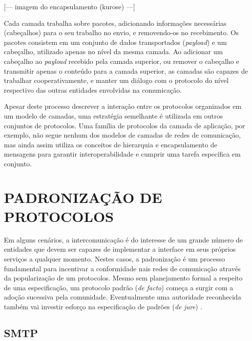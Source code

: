 [--- imagem do encapsulamento (kurose) ---]

Cada camada trabalha sobre pacotes, adicionando informações necessárias (cabeçalhos)
para o seu trabalho no envio, e removendo-os no recebimento. Os pacotes consistem em
um conjunto de dados transportados (\textit{payload}) e um cabeçalho, utilizado
apenas no nível da mesma camada. Ao adicionar um cabeçalho ao \textit{payload}
recebido pela camada superior, ou remover o cabeçalho e transmitir apenas o conteúdo
para a camada superior, as camadas são capazes de trabalhar cooperativamente, e
manter um diálogo com o protocolo do nível respectivo das outras entidades
envolvidas na comunicação.

Apesar deste processo descrever a interação entre os protocolos organizados em um
modelo de camadas, uma estratégia semelhante é utilizada em outros conjuntos de
protocolos. Uma família de protocolos da camada de aplicação, por exemplo, não
segue nenhum dos modelos de camadas de redes de comunicação, mas ainda assim utiliza
os conceitos de hierarquia e encapsulamento de mensagens para garantir
interoperabilidade e cumprir uma tarefa específica em conjunto.

\section{PADRONIZAÇÃO DE PROTOCOLOS}

Em alguns cenários, a intercomunicação é do interesse de um grande número de
entidades que devem ser capazes de implementar a interface em seus próprios serviços
a qualquer momento. Nestes casos, a padronização é um processo fundamental para
incentivar a conformidade nais redes de comunicação através da popularização de um
protocolos. Mesmo sem planejamento formal a respeito de uma especificação, um
protocolo padrão (\textit{de facto}) começa a surgir com a adoção sucessiva pela
comunidade. Eventualmente uma autoridade reconhecida também vai investir esforço na
especificação de padrões (\textit{de jure}) \cite{tanenbaum2010}.



\subsection{SMTP}



